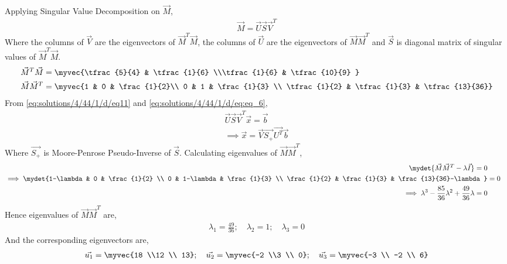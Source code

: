 Applying Singular Value Decomposition on $\vec{M}$,
\begin{align} \label{eq:solutions/4/44/1/d/eq:eq_6}
    \vec{M}=\vec{U}\vec{S}\vec{V}^T
\end{align}
Where the columns of $\vec{V}$ are the eigenvectors of $\vec{M}^T\vec{M}$, the columns of $\vec{U}$ are the eigenvectors of $\vec{M}\vec{M}^T$ and $\vec{S}$ is diagonal matrix of singular values of $\vec{M}^T\vec{M}$.
\begin{align}
    \vec{M}^T \vec{M} &= \myvec{\tfrac{5}{4} & \tfrac{1}{6}  \\\tfrac{1}{6}  & \tfrac{10}{9} }\label{eq:solutions/4/44/1/d/eq:eq_7} \\
    \vec{M} \vec{M}^T &= \myvec{1 & 0 & \frac{1}{2}\\ 0 & 1 & \frac{1}{3} \\ \tfrac{1}{2} & \tfrac{1}{3} & \tfrac{13}{36}} \label{eq:solutions/4/44/1/d/eq:eq_8}
\end{align}
From \eqref{eq:solutions/4/44/1/d/eq11} and \eqref{eq:solutions/4/44/1/d/eq:eq_6},
\begin{align}
    \vec{U} \vec{S} \vec{V}^T \vec{x} = \vec{b} \nonumber \\
    \implies \vec{x} = \vec{V} \vec{S_+} \vec{U^T} \vec{b} \label{eq:solutions/4/44/1/d/eq:eq_9}
\end{align}
Where $\vec{S_+}$ is Moore-Penrose Pseudo-Inverse of $\vec{S}$. Calculating eigenvalues of $\vec{M}\vec{M}^T$,
\begin{align}
    \mydet{\vec{M} \vec{M}^T - \lambda \vec{I}} = 0 \nonumber \\
    \implies \mydet{1-\lambda & 0 & \frac{1}{2} \\ 0 & 1-\lambda & \frac{1}{3} \\ \frac{1}{2} & \frac{1}{3} & \frac{13}{36}-\lambda} &= 0 \nonumber \\
    \implies \lambda^3 - \frac{85}{36}\lambda^2 + \frac{49}{36}\lambda =0 \nonumber
\end{align}
Hence eigenvalues of $\vec{M}\vec{M}^T$ are,
\begin{align} \label{eq:solutions/4/44/1/d/eq:eq_10}
    \lambda_1 = \frac{49}{36}; \quad \lambda_2 = 1; \quad \lambda_3 =0
\end{align}
And the corresponding eigenvectors are,
\begin{align}
     \vec{u_1} = \myvec{18 \\12 \\ 13}; \quad \vec{u_2} = \myvec{-2 \\3 \\ 0};\quad 
    \vec{u_3} = \myvec{-3 \\ -2 \\ 6}\label{eq:solutions/4/44/1/d/eq:eq_11} 
\end{align}
